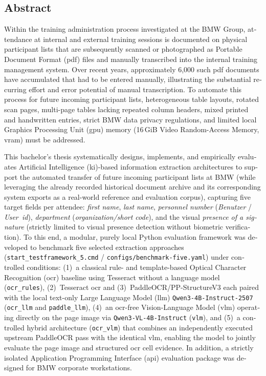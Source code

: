 \begin{otherlanguage}{english}
\chapter{Abstract}

Within the training administration process investigated at the BMW Group, attendance at internal and external training sessions is documented on physical participant lists that are subsequently scanned or photographed as Portable Document Format (\acs{pdf}) files and manually transcribed into the internal training management system. Over recent years, approximately 6,000 such \acs{pdf} documents have accumulated that had to be entered manually, illustrating the substantial recurring effort and error potential of manual transcription. To automate this process for future incoming participant lists, heterogeneous table layouts, rotated scan pages, multi-page tables lacking repeated column headers, mixed printed and handwritten entries, strict BMW data privacy regulations, and limited local Graphics Processing Unit (\acs{gpu}) memory (\mbox{16\,GiB} Video Random-Access Memory, \acs{vram}) must be addressed.

This bachelor's thesis systematically designs, implements, and empirically evaluates Artificial Intelligence (\acs{ki})-based information extraction architectures to support the automated transfer of future incoming participant lists at BMW (while leveraging the already recorded historical document archive and its corresponding system exports as a real-world reference and evaluation corpus), capturing five target fields per attendee: \emph{first name}, \emph{last name}, \emph{personnel number} (\emph{Benutzer} / \emph{User~\acs{id}}), \emph{department} (\emph{organization/short code}), and the visual \emph{presence of a signature} (strictly limited to visual presence detection without biometric verification). To this end, a modular, purely local Python evaluation framework was developed to benchmark five selected extraction approaches (\texttt{start\_testframework\_5.cmd} / \texttt{configs/benchmark-five.yaml}) under controlled conditions: (1)~a classical rule- and template-based Optical Character Recognition (\acs{ocr}) baseline using Tesseract without a language model (\texttt{ocr\_rules}), (2)~Tesseract \acs{ocr} and (3)~PaddleOCR/PP-StructureV3 each paired with the local text-only Large Language Model (\acs{llm}) \texttt{Qwen3-4B-Instruct-2507} (\texttt{ocr\_llm} and \texttt{paddle\_llm}), (4)~an \acs{ocr}-free Vision-Language Model (\acs{vlm}) operating directly on the page image via \texttt{Qwen3-VL-4B-Instruct} (\texttt{vlm}), and (5)~a controlled hybrid architecture (\texttt{ocr\_vlm}) that combines an independently executed upstream PaddleOCR pass with the identical \acs{vlm}, enabling the model to jointly evaluate the page image and structured \acs{ocr} cell evidence. In addition, a strictly isolated Application Programming Interface (\acs{api}) evaluation package was designed for BMW corporate workstations.


\end{otherlanguage}
